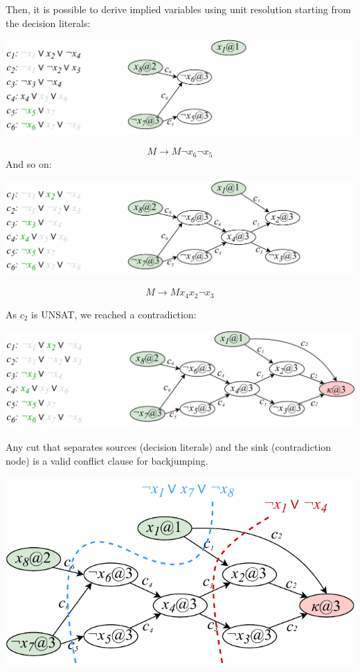 \begin{description}
\begin{example}
            Then, it is possible to derive implied variables using unit resolution starting from the decision literals:
            \begin{center}
                \includegraphics[width=0.8\linewidth]{./img/_cdcl_example2.pdf}
            \end{center}
            \[ M \rightarrow M \lnot x_6 \lnot x_5 \]
            And so on:
            \begin{center}
                \includegraphics[width=0.8\linewidth]{./img/_cdcl_example3.pdf}
            \end{center}
            \[ M \rightarrow M x_4 x_2 \lnot x_3 \]

            As $c_2$ is UNSAT, we reached a contradiction:
            \begin{center}
                \includegraphics[width=0.8\linewidth]{./img/_cdcl_example4.pdf}
            \end{center}
        \end{example}

    \begin{remark}
        Any cut that separates sources (decision literals) and the sink (contradiction node) is a valid conflict clause for backjumping.

        \begin{example} \phantom{}
            \begin{center}
                \includegraphics[width=0.55\linewidth]{./img/_cdcl_cut.pdf}
            \end{center}
        \end{example}
    \end{remark}


\end{description}
